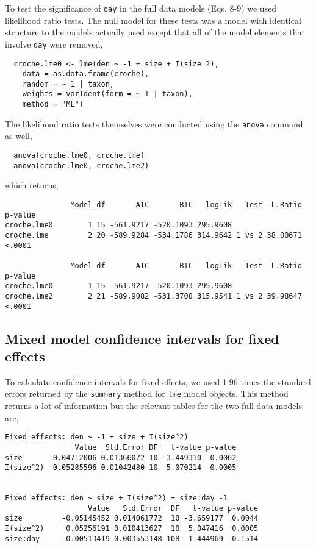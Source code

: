 \documentclass[12pt]{ecologyFORAPPENDIX}
\begin{document}
To test the significance of \texttt{day} in the full data models (Eqs. 8-9) we used likelihood ratio tests.  The null model for these tests was a model with identical structure to the models actually used except that all of the model elements that involve \texttt{day} were removed,
\singlespace 
\begin{verbatim}
  croche.lme0 <- lme(den ~ -1 + size + I(size 2),
    data = as.data.frame(croche),
    random = ~ 1 | taxon,
    weights = varIdent(form = ~ 1 | taxon),
    method = "ML")
\end{verbatim}
\doublespace
The likelihood ratio tests themselves were conducted using the \texttt{anova} command as well,
\vspace{-16pt}
\singlespace 
\begin{verbatim}
  anova(croche.lme0, croche.lme)
  anova(croche.lme0, croche.lme2)
\end{verbatim}
\doublespace
which returns,
\vspace{-16pt}
\singlespace 
\begin{verbatim}
               Model df       AIC       BIC   logLik   Test  L.Ratio p-value
croche.lme0        1 15 -561.9217 -520.1093 295.9608                        
croche.lme         2 20 -589.9284 -534.1786 314.9642 1 vs 2 38.00671  <.0001

               Model df       AIC       BIC   logLik   Test  L.Ratio p-value
croche.lme0        1 15 -561.9217 -520.1093 295.9608                        
croche.lme2        2 21 -589.9082 -531.3708 315.9541 1 vs 2 39.98647  <.0001
\end{verbatim}
\doublespace

\subsection{Mixed model confidence intervals for fixed effects}

To calculate confidence intervals for fixed effects, we used 1.96 times the standard errors returned by the \texttt{summary} method for \texttt{lme} model objects.  This method returns a lot of information but the relevant tables for the two full data models are,
\vspace{-16pt}
\singlespace 
\begin{verbatim}
Fixed effects: den ~ -1 + size + I(size^2) 
                Value  Std.Error DF   t-value p-value
size      -0.04712006 0.01366072 10 -3.449310  0.0062
I(size^2)  0.05285596 0.01042480 10  5.070214  0.0005
 
 
Fixed effects: den ~ size + I(size^2) + size:day -1 
                   Value   Std.Error  DF   t-value p-value
size         -0.05145452 0.014061772  10 -3.659177  0.0044
I(size^2)     0.05256191 0.010413627  10  5.047416  0.0005
size:day     -0.00513419 0.003553148 108 -1.444969  0.1514
\end{verbatim}
\doublespace
\end{document}
